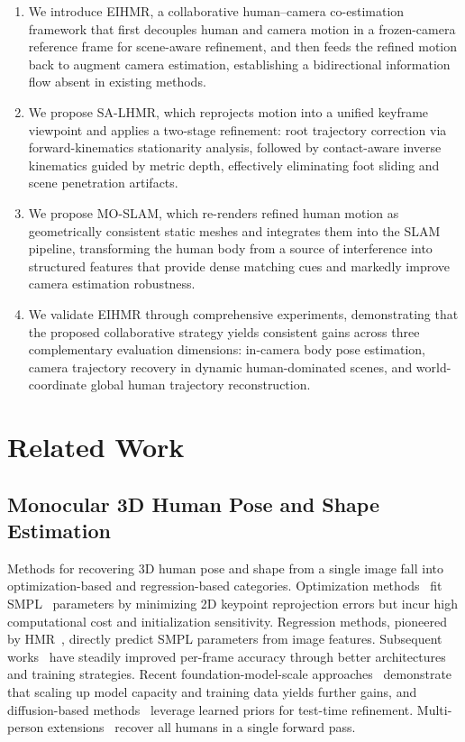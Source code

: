 \begin{enumerate}
\item We introduce EIHMR, a collaborative human--camera co-estimation framework that first decouples human and camera motion in a frozen-camera reference frame for scene-aware refinement, and then feeds the refined motion back to augment camera estimation, establishing a bidirectional information flow absent in existing methods.

\item We propose SA-LHMR, which reprojects motion into a unified keyframe viewpoint and applies a two-stage refinement: root trajectory correction via forward-kinematics stationarity analysis, followed by contact-aware inverse kinematics guided by metric depth, effectively eliminating foot sliding and scene penetration artifacts.

\item We propose MO-SLAM, which re-renders refined human motion as geometrically consistent static meshes and integrates them into the SLAM pipeline, transforming the human body from a source of interference into structured features that provide dense matching cues and markedly improve camera estimation robustness.

\item We validate EIHMR through comprehensive experiments, demonstrating that the proposed collaborative strategy yields consistent gains across three complementary evaluation dimensions: in-camera body pose estimation, camera trajectory recovery in dynamic human-dominated scenes, and world-coordinate global human trajectory reconstruction.
\end{enumerate}


\section{Related Work}
\label{sec:related}

\subsection{Monocular 3D Human Pose and Shape Estimation}

Methods for recovering 3D human pose and shape from a single image fall into optimization-based and regression-based categories. Optimization methods~\cite{SMPLify2016,NIKI2023} fit SMPL~\cite{SMPL} parameters by minimizing 2D keypoint reprojection errors but incur high computational cost and initialization sensitivity. Regression methods, pioneered by HMR~\cite{HMR2018}, directly predict SMPL parameters from image features. Subsequent works~\cite{PyMAF2021,CLIFF2022,TokenHMR2024} have steadily improved per-frame accuracy through better architectures and training strategies. Recent foundation-model-scale approaches~\cite{HMR2024,SMPLerX2024} demonstrate that scaling up model capacity and training data yields further gains, and diffusion-based methods~\cite{ScoreHMR2024} leverage learned priors for test-time refinement. Multi-person extensions~\cite{MultiHMR2024} recover all humans in a single forward pass.

